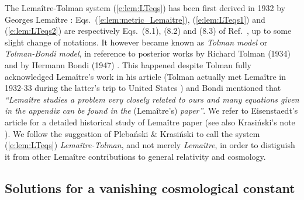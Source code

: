 \begin{hist}
The Lemaître-Tolman system (\ref{e:lem:LTeqs}) has been first derived
in 1932 by Georges Lemaître \cite{Lemai32}:
Eqs.~(\ref{e:lem:metric_Lemaitre}), (\ref{e:lem:LTeqs1}) and (\ref{e:lem:LTeqs2}) are
respectively Eqs.~(8.1), (8.2) and (8.3) of Ref.~\cite{Lemai32}, up to some slight
change of notations.
It however became known as \emph{Tolman model}
or \emph{Tolman-Bondi model}, in reference
to posterior works by Richard Tolman (1934) \cite{Tolma34}
and by Hermann Bondi (1947) \cite{Bondi47}.
This happened despite Tolman fully acknowledged Lemaître's work \cite{Lemai32} in his
article \cite{Tolma34} (Tolman actually met Lemaître in 1932-33 during
the latter's trip to United States \cite{Eisen93}) and Bondi \cite{Bondi47} mentioned
that \emph{``Lemaître studies a problem very closely related to ours
and many equations given in the appendix can be found in the} (Lemaître's) \emph{paper''}.
We refer to Eisenstaedt's article \cite{Eisen93} for a detailed historical
study of Lemaître paper \cite{Lemai32} (see also Krasi\'nski's note \cite{Krasi97}).
We follow the suggestion of Pleba\'nski \& Krasi\'nski \cite{PlebaK06}
to call the system (\ref{e:lem:LTeqs}) \emph{Lemaître-Tolman}, and not
merely \emph{Lemaître}, in order to distiguish it from other Lemaître contributions
to general relativity and cosmology.
\end{hist}


\subsection{Solutions for a vanishing cosmological constant} \label{s:lem:sol_lambda_zero}

